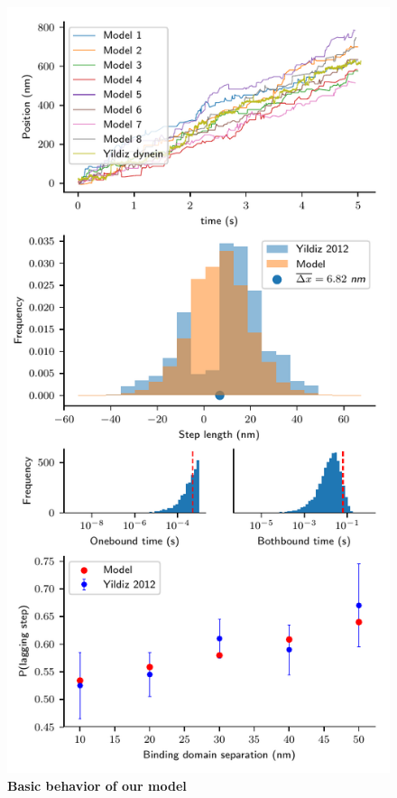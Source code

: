 \documentclass[9pt,twocolumn,twoside]{pnas-new}
\begin{document}





\begin{figure}[tbhp]
  \centering
  \includegraphics[width=\linewidth]{../../plots/paper_model_behavior}
\caption{\textbf{Basic behavior of our model}}
\label{fig:behavior}
\end{figure}
\end{document}
